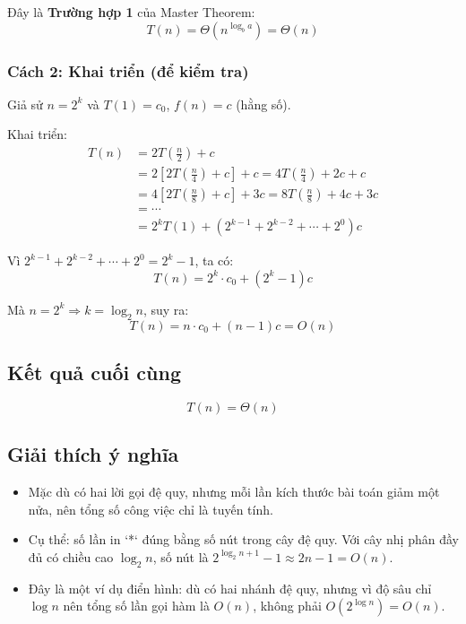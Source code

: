 \documentclass{article}
\begin{document}
Đây là \textbf{Trường hợp 1} của Master Theorem:
\[
T(n) = \Theta\left(n^{\log_b a}\right) = \Theta(n)
\]

\subsubsection{Cách 2: Khai triển (để kiểm tra)}

Giả sử \(n = 2^k\) và \(T(1) = c_0\), \(f(n) = c\) (hằng số).

Khai triển:
\[
\begin{aligned}
T(n) &= 2T\left(\frac{n}{2}\right) + c \\
&= 2\left[2T\left(\frac{n}{4}\right) + c\right] + c = 4T\left(\frac{n}{4}\right) + 2c + c \\
&= 4\left[2T\left(\frac{n}{8}\right) + c\right] + 3c = 8T\left(\frac{n}{8}\right) + 4c + 3c \\
&= \cdots \\
&= 2^k T(1) + (2^{k-1} + 2^{k-2} + \cdots + 2^0)c
\end{aligned}
\]

Vì \(2^{k-1} + 2^{k-2} + \cdots + 2^0 = 2^k - 1\), ta có:
\[
T(n) = 2^k \cdot c_0 + (2^k - 1)c
\]

Mà \(n = 2^k \Rightarrow k = \log_2 n\), suy ra:
\[
T(n) = n \cdot c_0 + (n - 1)c = O(n)
\]

\subsection{Kết quả cuối cùng}

\[
\boxed{T(n) = \Theta(n)}
\]

\subsection{Giải thích ý nghĩa}

\begin{itemize}
    \item Mặc dù có hai lời gọi đệ quy, nhưng mỗi lần kích thước bài toán giảm một nửa, nên tổng số công việc chỉ là tuyến tính.
    \item Cụ thể: số lần in `*` đúng bằng số nút trong cây đệ quy. Với cây nhị phân đầy đủ có chiều cao \(\log_2 n\), số nút là \(2^{\log_2 n + 1} - 1 \approx 2n - 1 = O(n)\).
    \item Đây là một ví dụ điển hình: dù có hai nhánh đệ quy, nhưng vì độ sâu chỉ \(\log n\) nên tổng số lần gọi hàm là \(O(n)\), không phải \(O(2^{\log n}) = O(n)\).
\end{itemize}
\end{document}
